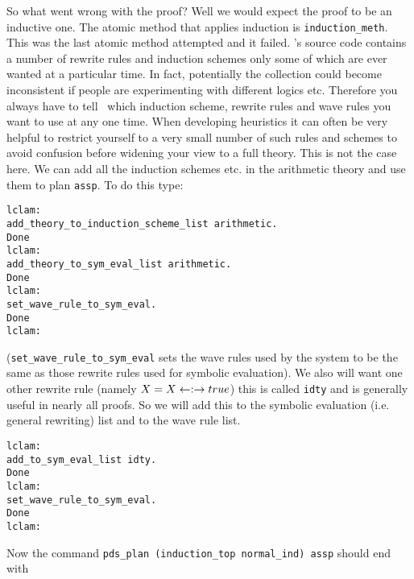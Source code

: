 So what went wrong with the proof?  Well we would expect the proof to
be an inductive one.  The atomic method that
applies induction is {\tt induction\_meth}.
This was the last atomic method attempted and it failed.  \lclam's
source code contains a number of rewrite rules and induction schemes
only some of which are ever wanted at a particular time.  In fact,
potentially the collection could become inconsistent if people are
experimenting with different logics etc.  Therefore you always have to 
tell \lclam\ which induction scheme, rewrite
rules and wave rules you
want to use at any one time.  When developing heuristics it can often
be very helpful to restrict yourself to a very small number of such
rules and schemes
to avoid confusion before widening your view to a full theory.  This
is not the case here.  We can add all the induction schemes etc. in
the arithmetic theory and use them to plan
{\tt assp}.  To do this type:
\begin{verbatim}
lclam:
add_theory_to_induction_scheme_list arithmetic.
Done
lclam:
add_theory_to_sym_eval_list arithmetic.
Done
lclam:
set_wave_rule_to_sym_eval.
Done
lclam:
\end{verbatim}  ({\tt set\_wave\_rule\_to\_sym\_eval} sets the wave rules used by the system to be the same as those rewrite rules used for symbolic evaluation).
We also will want one other rewrite rule (namely $X=X \leftarrow:\rightarrow true$) 
this is called {\tt idty} and is generally useful in
nearly all proofs.  So we will add this to the symbolic
evaluation
(i.e. general rewriting) list and to the wave rule
list.
\begin{verbatim}
lclam:
add_to_sym_eval_list idty.
Done
lclam:
set_wave_rule_to_sym_eval.
Done
lclam:
\end{verbatim}

Now the command {\tt pds\_plan (induction\_top normal\_ind)
assp} should
end with

